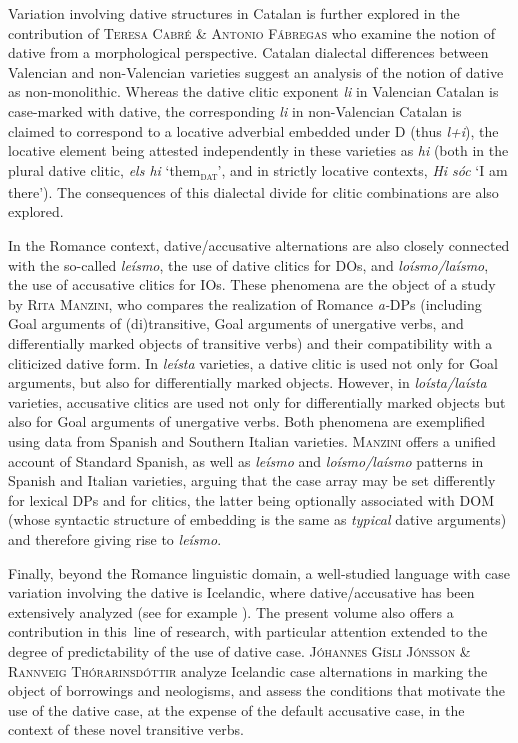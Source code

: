 \documentclass[output=paper,modfonts,nonflat,colorlinks,citecolor=brown]{langsci/langscibook}
\begin{document}
\newpage
Variation involving dative structures in Catalan is further explored in  the contribution of {\textsc{Teresa Cabré \& Antonio Fábregas}} who examine the notion of dative from a morphological perspective. Catalan dialectal differences between Valencian and non-Valencian varieties suggest an analysis of the notion of dative as non-monolithic. Whereas the dative clitic exponent {\textit{li}} in Valencian Catalan is case-marked with dative, the corresponding {\textit{li}} in non-Valencian Catalan is claimed to correspond to a locative adverbial embedded under D (thus {\textit{l+i}}), the locative element being attested independently in these varieties as {\textit{hi}} (both in the plural dative clitic, {\textit{els hi}} ‘them{\textsc{\textsubscript{dat}}}’, and in strictly locative contexts, {\textit{Hi sóc}} ‘I am there’). The consequences of this dialectal divide for clitic combinations are also explored.



In the Romance context, dative/accusative alternations are also closely connected with the so-called {\textit{leísmo}}, the use of dative clitics for DOs, and {\textit{loísmo/la\-ís\-mo}}, the use of accusative clitics for IOs. These phenomena are the object of a study by {\textsc{Rita Manzini,} who} compares the realization of Romance {\textit{a-}}DPs (including Goal arguments of (di)transitive, Goal arguments of unergative verbs, and differentially marked objects of transitive verbs) and their compatibility with a cliticized dative form. In {\textit{leísta}} varieties, a dative clitic is used not only for Goal arguments, but also for differentially marked objects. However, in {\textit{loísta/laísta}} varieties, accusative clitics are used not only for differentially marked objects but also for Goal arguments of unergative verbs. Both phenomena are exemplified using data from Spanish and Southern Italian varieties. {\textsc{Manzini}} offers a unified account of Standard Spanish, as well as {\textit{leísmo}} and {\textit{loísmo/laísmo}} patterns in Spanish and Italian varieties, arguing that the case array may be set differently for lexical DPs and for clitics, the latter being optionally associated with DOM (whose syntactic structure of embedding is the same as {\textit{typical}} dative arguments) and therefore giving rise to {\textit{leísmo}}.



Finally, beyond the Romance linguistic domain, a well-studied language with case variation involving the dative is Icelandic, where dative/accusative has been extensively analyzed (see for example \citealt{Barðdal2001, Barðdal2008,Svenonius2002,Maling2002,JónssonEythórsson2005}). The present volume also offers a contribution in this~line of research, with particular attention extended to the degree of predictability of the use of dative case. {\textsc{Jóhannes Gísli Jónsson \& Rannveig Thórarinsdóttir}} analyze Icelandic case alternations in marking the object of borrowings and neologisms, and assess the conditions that motivate the use of the dative case, at the expense of the default accusative case, in the context of these novel transitive verbs.
\end{document}
